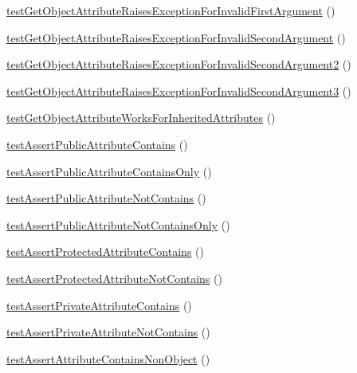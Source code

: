 \begin{DoxyCompactItemize}
\item 
\mbox{\hyperlink{class_framework___assert_test_a647eae92727eadbb555b5672b1a7ed96}{test\+Get\+Object\+Attribute\+Raises\+Exception\+For\+Invalid\+First\+Argument}} ()
\item 
\mbox{\hyperlink{class_framework___assert_test_a8c34300c5984436272598c1a74d23d3a}{test\+Get\+Object\+Attribute\+Raises\+Exception\+For\+Invalid\+Second\+Argument}} ()
\item 
\mbox{\hyperlink{class_framework___assert_test_acc161aa1e8dad6022832a62d3d631062}{test\+Get\+Object\+Attribute\+Raises\+Exception\+For\+Invalid\+Second\+Argument2}} ()
\item 
\mbox{\hyperlink{class_framework___assert_test_a49e124592ce1b34e45a7fc042c0d81c2}{test\+Get\+Object\+Attribute\+Raises\+Exception\+For\+Invalid\+Second\+Argument3}} ()
\item 
\mbox{\hyperlink{class_framework___assert_test_a51c8663bd4a6525dfd92d339c3084c09}{test\+Get\+Object\+Attribute\+Works\+For\+Inherited\+Attributes}} ()
\item 
\mbox{\hyperlink{class_framework___assert_test_a00413bfd24eef9bb674675429475b95f}{test\+Assert\+Public\+Attribute\+Contains}} ()
\item 
\mbox{\hyperlink{class_framework___assert_test_a22d650c9cbdb4b52e9c1718083054ecf}{test\+Assert\+Public\+Attribute\+Contains\+Only}} ()
\item 
\mbox{\hyperlink{class_framework___assert_test_a10a06eedfdc9808d514f78fb23082542}{test\+Assert\+Public\+Attribute\+Not\+Contains}} ()
\item 
\mbox{\hyperlink{class_framework___assert_test_a898ff3d4332bead76ec19aa3dc35a4b4}{test\+Assert\+Public\+Attribute\+Not\+Contains\+Only}} ()
\item 
\mbox{\hyperlink{class_framework___assert_test_abafe87b80cc07e2d67de6ab106263e10}{test\+Assert\+Protected\+Attribute\+Contains}} ()
\item 
\mbox{\hyperlink{class_framework___assert_test_a21708e78fc5c313ba448c9b1878ac1bc}{test\+Assert\+Protected\+Attribute\+Not\+Contains}} ()
\item 
\mbox{\hyperlink{class_framework___assert_test_abbbd76ff74a97d731af124c0394acfdb}{test\+Assert\+Private\+Attribute\+Contains}} ()
\item 
\mbox{\hyperlink{class_framework___assert_test_afdc9a6778eb8e221ca86a34746f12f89}{test\+Assert\+Private\+Attribute\+Not\+Contains}} ()
\item 
\mbox{\hyperlink{class_framework___assert_test_a8ca57009d4c90f9d0f068b3c8526801d}{test\+Assert\+Attribute\+Contains\+Non\+Object}} ()

\end{DoxyCompactItemize}
